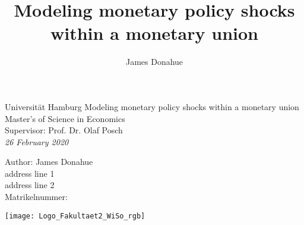\documentclass[a4paper, 12pt, oneside]{report}
\author{James Donahue}
\title{Modeling monetary policy shocks within a monetary union}
\begin{document}
\onehalfspacing

\thispagestyle{empty}
\begin{titlepage}
	\begin{center}
		\vspace*{\fill}
		{\Large Universität Hamburg}
		\vfill
		{\Huge Modeling monetary policy shocks within a monetary union }\\ 
		\hfill \break
		\vfill
		Master's of Science in Economics \\
		Supervisor: Prof. Dr. Olaf Posch \\ 
		\textit{26 February 2020}
		\vfill
	\end{center}
	\vfill
	Author: James Donahue \\ 
	address line 1 \\ 
	address line 2 \\ 
	Matrikelnummer: \\[2mm]
\begin{center}
	\texttt{[image: Logo\_Fakultaet2\_WiSo\_rgb]}
	\end{center}
\end{titlepage}

\renewcommand{\cftfigpresnum}{Abb. }
\renewcommand{\cfttabpresnum}{Tab. }
\renewcommand{\cftfigaftersnum}{:}
\renewcommand{\cfttabaftersnum}{:}
\setlength{\cftfignumwidth}{2cm}
\setlength{\cfttabnumwidth}{2cm}
\setlength{\cftfigindent}{0cm}
\setlength{\cfttabindent}{0cm}

%
\end{document}

